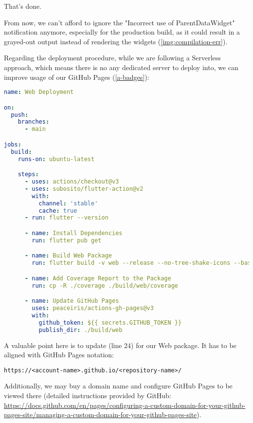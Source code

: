 \noindent That's done.

From now, we can't afford to ignore the "Incorrect use of ParentDataWidget" notification anymore, especially for the 
production build, as it could result in a grayed-out output instead of rendering the widgets (\cref{img:compilation-err}).

Regarding the deployment procedure, while we are following a Serverless approach, which means there is no any dedicated 
server to deploy into, we can improve usage of our GitHub Pages (\ref{a-badges}):

\begin{lstlisting}[language=yaml]
name: Web Deployment

on:
  push:
    branches:
      - main

jobs:
  build:
    runs-on: ubuntu-latest

    steps:
      - uses: actions/checkout@v3
      - uses: subosito/flutter-action@v2
        with:
          channel: 'stable'
          cache: true
      - run: flutter --version

      - name: Install Dependencies
        run: flutter pub get

      - name: Build Web Package
        run: flutter build -v web --release --no-tree-shake-icons --base-href="/app-finance/"

      - name: Add Coverage Report to the Package
        run: cp -R ./coverage ./build/web/coverage

      - name: Update GitHub Pages 
        uses: peaceiris/actions-gh-pages@v3
        with:
          github_token: ${{ secrets.GITHUB_TOKEN }}
          publish_dir: ./build/web
\end{lstlisting}

\noindent A valuable point here is to update  (line 24) for our Web package. It has to be aligned with 
GitHub Pages notation:

\begin{lstlisting}[language=terminal]
https://<account-name>.github.io/<repository-name>/
\end{lstlisting}

Additionally, we may buy a domain name and configure GitHub Pages to be viewed there (detailed instructions provided by
GitHub: \href{https://docs.github.com/en/pages/configuring-a-custom-domain-for-your-github-pages-site/managing-a-custom-domain-for-your-github-pages-site}{https://docs.github.com/en/pages/configuring-a-custom-domain-for-your-github-pages-site/managing-a-custom-domain-for-your-github-pages-site}).


